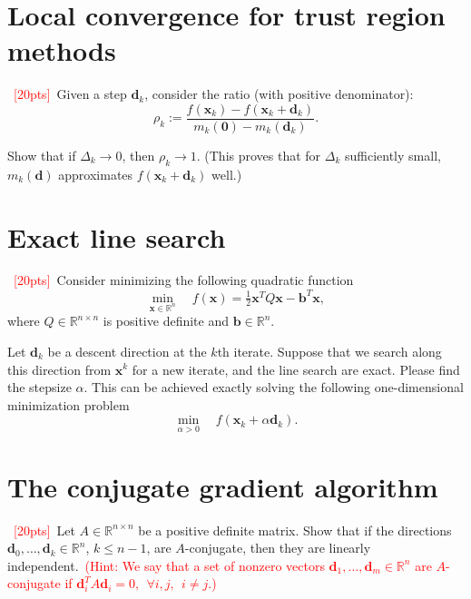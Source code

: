 \documentclass[10pt]{article}
\begin{document}
\section{Local convergence for trust region methods}
~\textcolor{red}{[20pts]}~Given a step $\bm{d}_{k}$, consider the ratio (with positive denominator):
\begin{equation}
	\rho_{k} := \frac{f(\bm{x}_{k}) - f(\bm{x}_{k} + \bm{d}_{k}) }{m_{k}(\bm{0}) - m_{k}(\bm{d}_{k})}.
\end{equation}

Show that if $\Delta_{k}\to 0$, then $\rho_{k}\to1$. (This proves that for $\Delta_{k}$ sufficiently small, $m_{k}(\bm{d})$ approximates $f(\bm{x}_{k} + \bm{d}_{k})$ well.)

\section{Exact line search}
~\textcolor{red}{[20pts]}~Consider minimizing the following quadratic function
\begin{equation}\label{eq: quadratic}
	\min_{\bm{x}\in\mathbb{R}^{n}}\quad f(\bm{x}) = \tfrac{1}{2}\bm{x}^{T}Q\bm{x} - \bm{b}^{T}\bm{x},
\end{equation}
where $Q\in\mathbb{R}^{n\times n}$ is positive definite and $\bm{b} \in \mathbb{R}^{n}$.

Let $\bm{d}_{k}$ be a descent direction at the $k$th iterate. Suppose that we search along this direction from $\bm{x}^{k}$ for a new iterate, and the line search are exact. Please find the stepsize $\alpha$. This can be achieved exactly solving the following one-dimensional minimization problem
\begin{equation}
	\min_{\alpha > 0} \quad f(\bm{x}_{k} + \alpha \bm{d}_{k}).
\end{equation}

\section{The conjugate gradient algorithm}
~\textcolor{red}{[20pts]}~Let $A\in \mathbb{R}^{n\times n}$ be a positive definite matrix. Show that if the directions $\bm{d}_{0}, \ldots, \bm{d}_{k}\in\mathbb{R}^{n}$, $k\leq n-1$,  are $A$-conjugate, then they are linearly independent.~\textcolor{red}{(Hint: We say that a set of nonzero vectors $\bm{d}_1,\ldots,\bm{d}_{m}\in\mathbb{R}^{n}$ are $A$-conjugate if $\bm{d}_{i}^{T}A\bm{d}_{i} = 0,\ \  \forall i,j,~~i\neq j$.)}
\end{document}
